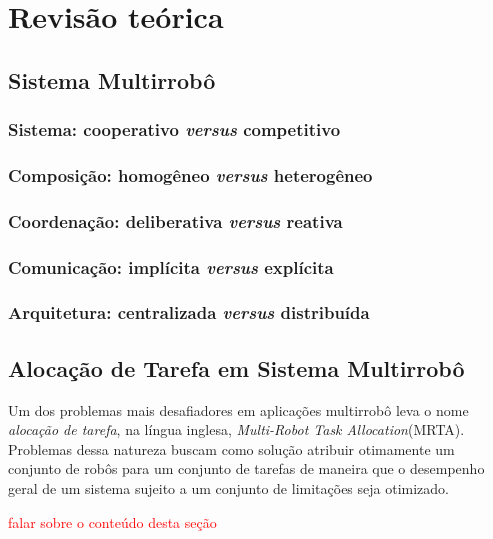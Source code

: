 \chapter[Revisão teórica]{Revisão teórica} \label{cap:revisao}
    
    \section{Sistema Multirrobô} \label{sec:mrs}
        
        \subsection{Sistema: cooperativo \textit{versus} competitivo}
        
        \subsection{Composição: homogêneo \textit{versus} heterogêneo}
        
        \subsection{Coordenação: deliberativa \textit{versus} reativa}
        
        \subsection{Comunicação: implícita \textit{versus} explícita}
        
        \subsection{Arquitetura: centralizada \textit{versus} distribuída}
    
    \section{Alocação de Tarefa em Sistema Multirrobô} \label{sec:mrta}
        Um dos problemas mais desafiadores em aplicações multirrobô leva o nome \textit{alocação de tarefa}, na língua inglesa, \textit{Multi-Robot Task Allocation}(MRTA). Problemas dessa natureza buscam como solução atribuir otimamente um conjunto de robôs para um conjunto de tarefas de maneira que o desempenho geral de um sistema sujeito a um conjunto de limitações seja otimizado.
        
        \textcolor{red}{falar sobre o conteúdo desta seção}
        

